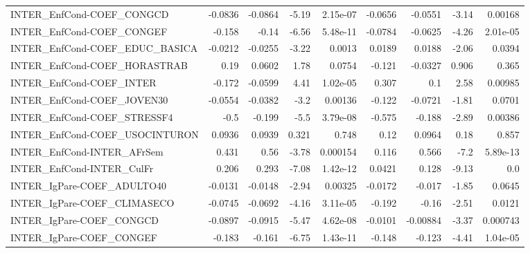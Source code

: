 \begin{tabular}{lrrrrrrrr}
INTER\_EnfCond-COEF\_CONGCD             &     -0.0836 &      -0.0864 &   -5.19 & 2.15e-07 &    -0.0656 &     -0.0551 &        -3.14 &       0.00168 \\
INTER\_EnfCond-COEF\_CONGEF             &      -0.158 &        -0.14 &   -6.56 & 5.48e-11 &    -0.0784 &     -0.0625 &        -4.26 &      2.01e-05 \\
INTER\_EnfCond-COEF\_EDUC\_BASICA        &     -0.0212 &      -0.0255 &   -3.22 &   0.0013 &     0.0189 &      0.0188 &        -2.06 &        0.0394 \\
INTER\_EnfCond-COEF\_HORASTRAB          &        0.19 &       0.0602 &    1.78 &   0.0754 &     -0.121 &     -0.0327 &        0.906 &         0.365 \\
INTER\_EnfCond-COEF\_INTER              &      -0.172 &      -0.0599 &    4.41 & 1.02e-05 &      0.307 &         0.1 &         2.58 &       0.00985 \\
INTER\_EnfCond-COEF\_JOVEN30            &     -0.0554 &      -0.0382 &    -3.2 &  0.00136 &     -0.122 &     -0.0721 &        -1.81 &        0.0701 \\
INTER\_EnfCond-COEF\_STRESSF4           &        -0.5 &       -0.199 &    -5.5 & 3.79e-08 &     -0.575 &      -0.188 &        -2.89 &       0.00386 \\
INTER\_EnfCond-COEF\_USOCINTURON        &      0.0936 &       0.0939 &   0.321 &    0.748 &       0.12 &      0.0964 &         0.18 &         0.857 \\
INTER\_EnfCond-INTER\_AFrSem            &       0.431 &         0.56 &   -3.78 & 0.000154 &      0.116 &       0.566 &         -7.2 &      5.89e-13 \\
INTER\_EnfCond-INTER\_CulFr             &       0.206 &        0.293 &   -7.08 & 1.42e-12 &     0.0421 &       0.128 &        -9.13 &           0.0 \\
INTER\_IgPare-COEF\_ADULTO40            &     -0.0131 &      -0.0148 &   -2.94 &  0.00325 &    -0.0172 &      -0.017 &        -1.85 &        0.0645 \\
INTER\_IgPare-COEF\_CLIMASECO           &     -0.0745 &      -0.0692 &   -4.16 & 3.11e-05 &     -0.192 &       -0.16 &        -2.51 &        0.0121 \\
INTER\_IgPare-COEF\_CONGCD              &     -0.0897 &      -0.0915 &   -5.47 & 4.62e-08 &    -0.0101 &    -0.00884 &        -3.37 &      0.000743 \\
INTER\_IgPare-COEF\_CONGEF              &      -0.183 &       -0.161 &   -6.75 & 1.43e-11 &     -0.148 &      -0.123 &        -4.41 &      1.04e-05 \\

\end{tabular}
